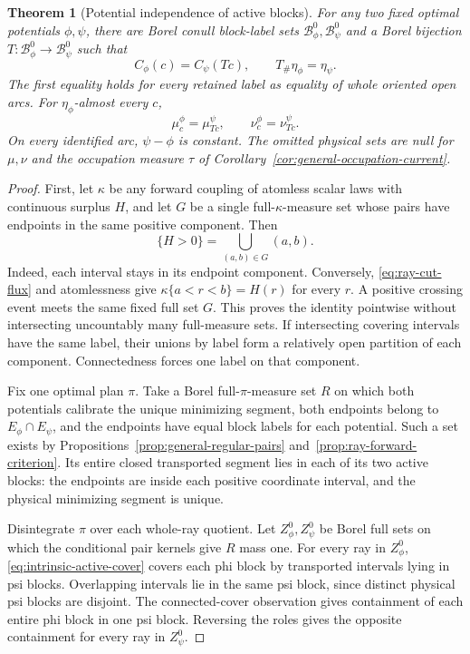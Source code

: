 \documentclass[11pt,reqno]{amsart}
\newtheorem{theorem}{Theorem}[section]
\theoremstyle{definition}
\theoremstyle{remark}
\numberwithin{equation}{section}
\begin{document}
\begin{theorem}[Potential independence of active blocks]
\label{thm:intrinsic-active-invariance}
For any two fixed optimal potentials \(\phi,\psi\), there are Borel
conull block-label sets \(\mathcal B_\phi^0,\mathcal B_\psi^0\)
and a Borel bijection \(T:\mathcal B_\phi^0\to\mathcal B_\psi^0\)
such that
\[
 C_\phi(c)=C_\psi(Tc),\qquad T_\#\eta_\phi=\eta_\psi.
\]
The first equality holds for every retained label as equality of whole
oriented open arcs. For \(\eta_\phi\)-almost every \(c\),
\[
 \mu_c^\phi=\mu_{Tc}^\psi,\qquad
 \nu_c^\phi=\nu_{Tc}^\psi.
\]
On every identified arc, \(\psi-\phi\) is constant. The omitted
physical sets are null for \(\mu,\nu\) and the occupation measure
\(\tau\) of Corollary~\ref{cor:general-occupation-current}.
\end{theorem}
\begin{proof}
First, let \(\kappa\) be any forward coupling of atomless scalar
laws with continuous surplus \(H\), and let \(G\) be a single
full-\(\kappa\)-measure set whose pairs have endpoints in the same
positive component. Then
\begin{equation}
\label{eq:intrinsic-active-cover}
             \{H>0\}=\bigcup_{(a,b)\in G}(a,b).
\end{equation}
Indeed, each interval stays in its endpoint component. Conversely,
\eqref{eq:ray-cut-flux} and atomlessness give
\(\kappa\{a<r<b\}=H(r)\) for every \(r\). A positive crossing
event meets the same fixed full set \(G\). This proves the identity
pointwise without intersecting uncountably many full-measure sets.
If intersecting covering intervals have the same label, their unions
by label form a relatively open partition of each component.
Connectedness forces one label on that component.

Fix one optimal plan \(\pi\). Take a Borel full-\(\pi\)-measure
set \(R\) on which both potentials calibrate the unique minimizing
segment, both endpoints belong to \(E_\phi\cap E_\psi\), and
the endpoints have equal block labels for each potential.
Such a set exists by Propositions~\ref{prop:general-regular-pairs}
and~\ref{prop:ray-forward-criterion}. Its entire closed transported
segment lies in each of its two active blocks: the endpoints are
inside each positive coordinate interval, and the physical minimizing
segment is unique.

Disintegrate \(\pi\) over each whole-ray quotient. Let
\(Z_\phi^0,Z_\psi^0\) be Borel full sets on which the conditional
pair kernels give \(R\) mass one. For every ray in \(Z_\phi^0\),
\eqref{eq:intrinsic-active-cover} covers each phi block by transported
intervals lying in psi blocks. Overlapping intervals lie in the same
psi block, since distinct physical psi blocks are disjoint.
The connected-cover observation gives containment of each entire
phi block in one psi block. Reversing the roles gives the opposite
containment for every ray in \(Z_\psi^0\).


\end{proof}
\end{document}
